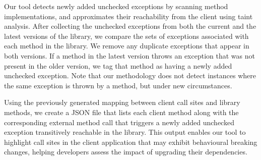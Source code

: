 Our tool detects newly added unchecked exceptions by scanning method implementations, and approximates their reachability from the client using taint analysis. After collecting the unchecked exceptions from both the current and the latest versions of the library, we compare the sets of exceptions associated with each method in the library. We remove any duplicate exceptions that appear in both versions. If a method in the latest version throws an exception that was not present in the older version, we tag that method as having a newly added unchecked exception. Note that our methodology does not detect instances where the same exception is thrown by a method, but under new circumstances.

Using the previously generated mapping between client call sites and library methods, we create a JSON file that lists each client method along with the corresponding external method call that triggers a newly added unchecked exception transitively reachable in the library. This output enables our tool to highlight call sites in the client application that may exhibit behavioural breaking changes, helping developers assess the impact of upgrading their dependencies.
